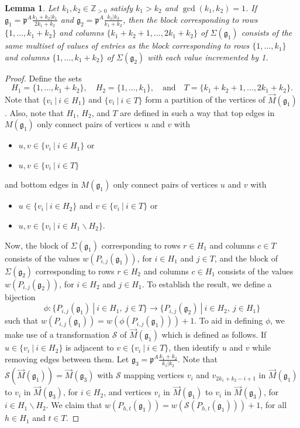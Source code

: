 \documentclass[letterpaper,10pt]{article}
\newtheorem{lemma}[theorem]{Lemma}
\begin{document}
\begin{lemma}\label{lem:tlbbase1}
Let $k_1,k_2\in\mathbb{Z}_{>0}$ satisfy $k_1>k_2$ and $\gcd(k_1,k_2)=1$. If $\mathfrak{g}_1=\mathfrak{p}^A\frac{k_1+k_2|k_1}{2k_1+k_2}$ and $\mathfrak{g}_2=\mathfrak{p}^A\frac{k_1|k_2}{k_1+k_2}$, then the block corresponding to rows $\{1,\hdots,k_1+k_2\}$ and columns $\{k_1+k_2+1,\hdots,2k_1+k_2\}$ of $\Sigma(\mathfrak{g}_1)$ consists of the same multiset of values of entries as the block corresponding to rows $\{1,\hdots,k_1\}$ and columns $\{1,\hdots,k_1+k_2\}$ of $\Sigma(\mathfrak{g}_2)$ with each value incremented by 1.
\end{lemma}
\begin{proof}
Define the sets $$H_1=\{1,\hdots,k_1+k_2\},\quad H_2=\{1,\hdots,k_1\},\quad\text{and}\quad T=\{k_1+k_2+1,\hdots,2k_1+k_2\}.$$ Note that $\{v_i~|~i\in H_1\}$ and $\{v_i~|~i\in T\}$ form a partition of the vertices of $\overrightarrow{M}(\mathfrak{g}_1)$. Also, note that $H_1$, $H_2$, and $T$ are defined in such a way that top edges in $M(\mathfrak{g}_1)$ only connect pairs of vertices $u$ and $v$ with
\begin{itemize}
    \item $u,v\in \{v_i~|~i\in H_1\}$ or
    \item $u,v\in \{v_i~|~i\in T\}$
\end{itemize}
and bottom edges in $M(\mathfrak{g}_1)$ only connect pairs of vertices $u$ and $v$ with
\begin{itemize}
    \item $u\in\{v_i~|~i\in H_2\}$ and $v\in\{v_i~|~i\in T\}$ or
    \item $u,v\in \{v_i~|~i\in H_1\backslash H_2\}$.
\end{itemize}
Now, the block of $\Sigma(\mathfrak{g}_1)$ corresponding to rows $r\in H_1$ and columns $c\in T$ consists of the values $w(P_{i,j}(\mathfrak{g}_1))$, for $i\in H_1$ and $j\in T$, and the block of $\Sigma(\mathfrak{g}_2)$ corresponding to rows $r\in H_2$ and columns $c\in H_1$ consists of the values $w(P_{i,j}(\mathfrak{g}_2))$, for $i\in H_2$ and $j\in H_1$. To establish the result, we define a bijection $$\phi:\{P_{i,j}(\mathfrak{g}_1)~|~i\in H_1,~j\in T\}\to\{P_{i,j}(\mathfrak{g}_2)~|~i\in H_2,~j\in H_1\}$$ such that $w(P_{i,j}(\mathfrak{g}_1))=w(\phi(P_{i,j}(\mathfrak{g}_1)))+1$. To aid in defining $\phi$, we make use of a transformation $\mathcal{S}$ of $\overrightarrow{M}(\mathfrak{g}_1)$ which is defined as follows. If $u\in \{v_i~|~i\in H_2\}$ is adjacent to $v\in\{v_i~|~i\in T\}$, then identify $u$ and $v$ while removing edges between them. Let $\mathfrak{g}_3=\mathfrak{p}^A\frac{k_1+k_2}{k_1|k_2}$. Note that $\mathcal{S}(\overrightarrow{M}(\mathfrak{g}_1))=\overrightarrow{M}(\mathfrak{g}_3)$ with $\mathcal{S}$ mapping vertices $v_i$ and $v_{2k_1+k_2-i+1}$ in $\overrightarrow{M}(\mathfrak{g}_1)$ to $v_i$ in $\overrightarrow{M}(\mathfrak{g}_3)$, for $i\in H_2$, and vertices $v_i$ in $\overrightarrow{M}(\mathfrak{g}_1)$ to $v_i$ in $\overrightarrow{M}(\mathfrak{g}_3)$, for $i\in H_1\backslash H_2$. We claim that $w(P_{h,t}(\mathfrak{g}_1))=w(\mathcal{S}(P_{h,t}(\mathfrak{g}_1)))+1$, for all $h\in H_1$ and $t\in T$.


\end{proof}
\end{document}
